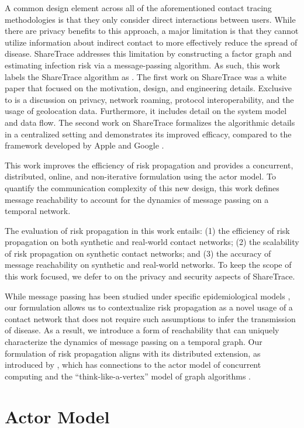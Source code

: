 A common design element across all of the aforementioned contact tracing methodologies is that they only consider direct interactions between users. While there are privacy benefits to this approach, a major limitation is that they cannot utilize information about indirect contact to more effectively reduce the spread of disease. ShareTrace addresses this limitation by constructing a factor graph and estimating infection risk via a message-passing algorithm. As such, this work labels the ShareTrace algorithm as . The first work on ShareTrace was a white paper that focused on the motivation, design, and engineering details. Exclusive to \cite{Ayday2020} is a discussion on privacy, network roaming, protocol interoperability, and the usage of geolocation data. Furthermore, it includes detail on the system model and data flow. The second work on ShareTrace \cite{Ayday2021} formalizes the algorithmic details in a centralized setting and demonstrates its improved efficacy, compared to the framework developed by Apple and Google \cite{AppleGoogle}.

This work improves the efficiency of risk propagation and provides a concurrent, distributed, online, and non-iterative formulation using the actor model. To quantify the communication complexity of this new design, this work defines message reachability to account for the dynamics of message passing on a temporal network. 

The evaluation of risk propagation in this work entails: (1) the efficiency of risk propagation on both synthetic and real-world contact networks; (2) the scalability of risk propagation on synthetic contact networks; and (3) the accuracy of message reachability on synthetic and real-world networks. To keep the scope of this work focused, we defer to \cite{Ayday2021} on the privacy and security aspects of ShareTrace.

While message passing has been studied under specific epidemiological models \cite{Karrer2010, Li2021}, our formulation allows us to contextualize risk propagation as a novel usage of a contact network that does not require such assumptions to infer the transmission of disease. As a result, we introduce a form of reachability that can uniquely characterize the dynamics of message passing on a temporal graph. Our formulation of risk propagation aligns with its distributed extension, as introduced by \cite{Ayday2021}, which has connections to the actor model of concurrent computing \cite{Baker1977, Agha1986} and the ``think-like-a-vertex'' model of graph algorithms \cite{McCune2015}.

\section{Actor Model}
